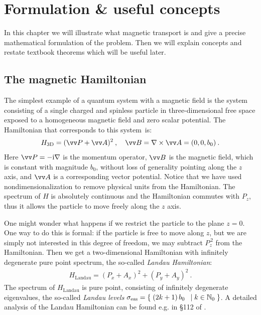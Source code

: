\chapter{Formulation \& useful concepts} \label{chapter-formulation}
In this chapter we will illustrate what magnetic transport is and give a precise mathematical formulation of the problem. Then we will explain concepts and restate textbook theorems which will be useful later.

\section{The magnetic Hamiltonian}
The simplest example of a quantum system with a magnetic field is the system consisting of a single charged and spinless particle in three-dimensional free space exposed to a homogeneous magnetic field and zero scalar potential. The Hamiltonian that corresponds to this system~is:
\begin{align*}
    H_\mathrm{3D} = (\vv P + \vv A)^2 \: , \quad
    \vv B = \nabla \times \vv A = (0, 0, b_0) \: .
\end{align*}
Here $\vv P = -\i \nabla$ is the momentum operator, $\vv B$ is the magnetic field, which is constant with magnitude $b_0$, without loss of generality pointing along the $z$ axis, and $\vv A$ is a corresponding vector potential. Notice that we have used nondimensionalization to remove physical units from the Hamiltonian. The spectrum of $H$ is absolutely continuous and the Hamiltonian commutes with $P_z$, thus it allows the particle to move freely along the $z$ axis.

One might wonder what happens if we restrict the particle to the plane $z=0$. One way to do this is formal: if the particle is free to move along $z$, but we are simply not interested in this degree of freedom, we may subtract $P_z^{\,2}$ from the Hamiltonian. Then we get a two-dimensional Hamiltonian with infinitely degenerate pure point spectrum, the so-called \textit{Landau Hamiltonian}:
\begin{align*}
    H_\mathrm{Landau} = (P_x + A_x)^2 + (P_y + A_y)^2 \: .
\end{align*}
The spectrum of $H_\mathrm{Landau}$ is pure point, consisting of infinitely degenerate eigenvalues, the so-called \textit{Landau levels} $\sigma_{\mathrm{ess}} = \{ \; {(2k + 1) \, b_0} $ $\;|\; k \in \mathbb{N}_0 \; \}$. A detailed analysis of the Landau Hamiltonian can be found e.g. in §112 of \citet{LandauLifshitz3}.

